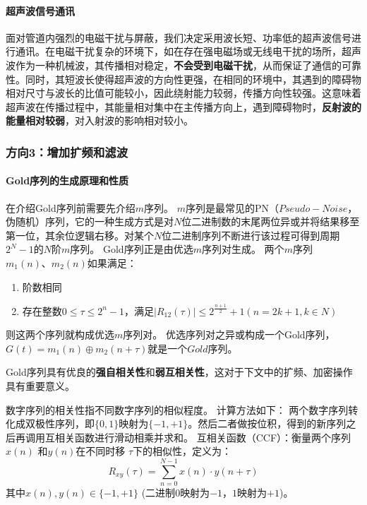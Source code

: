 \documentclass[12pt, a4paper]{article}
\begin{document}
\paragraph{超声波信号通讯}

面对管道内强烈的电磁干扰与屏蔽，我们决定采用波长短、功率低的超声波信号进行通讯。在电磁干扰复杂的环境下，如在存在强电磁场或无线电干扰的场所，超声波作为一种机械波，其传播相对稳定，\textbf{不会受到电磁干扰}，从而保证了通信的可靠性。同时，其短波长使得超声波的方向性更强，在相同的环境中，其遇到的障碍物相对尺寸与波长的比值可能较小，因此绕射能力较弱，传播方向性较强。这意味着超声波在传播过程中，其能量相对集中在主传播方向上，遇到障碍物时，\textbf{反射波的能量相对较弱}，对入射波的影响相对较小。

\subsubsection{方向3：增加扩频和滤波}

\paragraph{Gold序列的生成原理和性质}

在介绍Gold序列前需要先介绍$m$序列。
$m$序列是最常见的PN（$Pseudo-Noise$，伪随机）序列，它的一种生成方式是对$N$位二进制数的末尾两位异或并将结果移至第一位，其余位逻辑右移。对某个$N$位二进制序列不断进行该过程可得到周期$2^N-1$的$N$阶$m$序列。
Gold序列正是由优选$m$序列对生成。
两个$m$序列$m_1(n)、m_2(n)$如果满足：

\begin{enumerate}
    \item 阶数相同
    \item 存在整数$0\leq\tau\leq2^n-1$，满足$|R_{12}(\tau)|\le2^{\frac{n+1}{2}}+1(n=2k+1,k\in N)$
\end{enumerate}

则这两个序列就构成优选$m$序列对。
优选序列对之异或构成一个Gold序列，$G(t)=m_1(n)\oplus m_2(n+\tau)$就是一个$Gold$序列。

Gold序列具有优良的\textbf{强自相关性}和\textbf{弱互相关性}，这对于下文中的扩频、加密操作具有重要意义。

\begin{tcolorbox}[title=数字序列的相关性]
数字序列的相关性指不同数字序列的相似程度。
计算方法如下：
两个数字序列转化成双极性序列，即$\{0,1\}$映射为$\{-1,+1\}$。然后二者做按位积，得到的新序列之后再调用互相关函数进行滑动相乘并求和。
互相关函数（CCF）：衡量两个序列$x(n)$ 和$y(n)$在不同时移 $\tau$下的相似性，定义为：
$$R_{x y}(\tau)=\sum_{n=0}^{N-1} x(n) \cdot y(n+\tau)$$
其中$x(n), y(n) \in\{-1,+1\}$ (二进制$0$映射为$-1$，$1$映射为$+1$)。
\end{tcolorbox}
\end{document}
